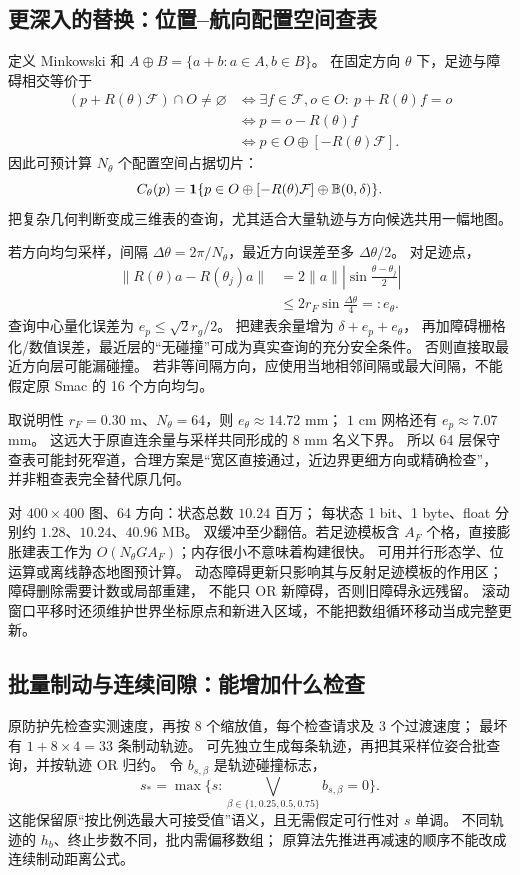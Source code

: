 \subsection{更深入的替换：位置--航向配置空间查表}
定义 Minkowski 和 $A\oplus B=\{a+b:a\in A,b\in B\}$。
在固定方向 $\theta$ 下，足迹与障碍相交等价于
\begin{align}
(p+R(\theta)\mathcal F)\cap O\ne\varnothing
&\iff \exists f\in\mathcal F,o\in O:\ p+R(\theta)f=o\\
&\iff p=o-R(\theta)f\\
&\iff p\in O\oplus[-R(\theta)\mathcal F].
\end{align}
因此可预计算 $N_\theta$ 个配置空间占据切片：
\begin{equation}
C_\theta(p)=\mathbf1\{p\in O\oplus[-R(\theta)\mathcal F]\oplus\mathbb B(0,\delta)\}.
\label{eq:cspace}
\end{equation}
把复杂几何判断变成三维表的查询，尤其适合大量轨迹与方向候选共用一幅地图。

若方向均匀采样，间隔 $\Delta\theta=2\pi/N_\theta$，最近方向误差至多 $\Delta\theta/2$。
对足迹点，
\begin{align}
\|R(\theta)a-R(\theta_j)a\|
&=2\|a\|\left|\sin\frac{\theta-\theta_j}{2}\right|\\
&\le2r_F\sin\frac{\Delta\theta}{4}
=:e_\theta.
\label{eq:anglebound}
\end{align}
查询中心量化误差为 $e_p\le\sqrt2r_g/2$。
把建表余量增为 $\delta+e_p+e_\theta$，
再加障碍栅格化/数值误差，最近层的“无碰撞”可成为真实查询的充分安全条件。
否则直接取最近方向层可能漏碰撞。
若非等间隔方向，应使用当地相邻间隔或最大间隔，不能假定原 Smac 的 16 个方向均匀。

取说明性 $r_F=0.30$ m、$N_\theta=64$，则 $e_\theta\approx14.72$ mm；
$1$ cm 网格还有 $e_p\approx7.07$ mm。
这远大于原直连余量与采样共同形成的 8 mm 名义下界。
所以 64 层保守查表可能封死窄道，合理方案是“宽区直接通过，近边界更细方向或精确检查”，
并非粗查表完全替代原几何。

对 $400\times400$ 图、64 方向：状态总数 $10.24$ 百万；
每状态 1 bit、1 byte、float 分别约 $1.28$、$10.24$、$40.96$ MB。
双缓冲至少翻倍。若足迹模板含 $A_F$ 个格，直接膨胀建表工作为
$O(N_\theta GA_F)$；内存很小不意味着构建很快。
可用并行形态学、位运算或离线静态地图预计算。
动态障碍更新只影响其与反射足迹模板的作用区；障碍删除需要计数或局部重建，
不能只 OR 新障碍，否则旧障碍永远残留。
滚动窗口平移时还须维护世界坐标原点和新进入区域，不能把数组循环移动当成完整更新。

\subsection{批量制动与连续间隙：能增加什么检查}
原防护先检查实测速度，再按 8 个缩放值，每个检查请求及 3 个过渡速度；
最坏有 $1+8\times4=33$ 条制动轨迹。
可先独立生成每条轨迹，再把其采样位姿合批查询，并按轨迹 OR 归约。
令 $b_{s,\beta}$ 是轨迹碰撞标志，
\[
s_*=\max\{s:\bigvee_{\beta\in\{1,0.25,0.5,0.75\}}b_{s,\beta}=0\}.
\]
这能保留原“按比例选最大可接受值”语义，且无需假定可行性对 $s$ 单调。
不同轨迹的 $h_b$、终止步数不同，批内需偏移数组；
原算法先推进再减速的顺序不能改成连续制动距离公式。

